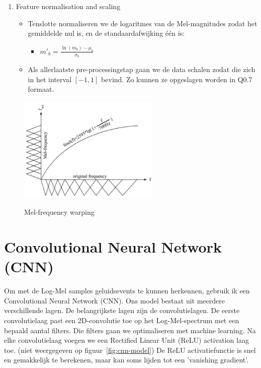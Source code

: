 \begin{no-awa}
\begin{enumerate}
	\item Feature normalisation and scaling
	      \begin{itemize}
		      \item Tenslotte normaliseren we de logaritmes van de Mel-magnitudes zodat het gemiddelde nul is, en de standaardafwijking één is:
		            \begin{itemize}[label={}]
			            \item \(m'_b = \frac{\ln\left( m_b \right) - \mu_b}{\sigma_b}\)
		            \end{itemize}
		      \item Als allerlaatste pre-processingstap gaan we de data schalen zodat die zich in het interval \(\left[ -1,1 \right]\) bevind. Zo kunnen ze opgeslagen worden in Q0.7 formaat. \cite{enwiki:q-format}
	      \end{itemize}
\end{enumerate}
\end{no-awa}


\begin{figure}[ht]
	\centering
	\includegraphics[width=0.6\textwidth]{figuren/Mel-frequency.png}
	\caption{Mel-frequency warping}
	\cite{efficient-feature-extraction}
	\label{fig:Mel-bands}
\end{figure}


\section{Convolutional Neural Network (CNN)}

Om met de Log-Mel samples geluidsevents te kunnen herkennen, gebruik ik een Convolutional Neural Network (CNN). Ons model bestaat uit meerdere verschillende lagen. De belangrijkste lagen zijn de convolutielagen. De eerste convolutielaag past een 2D-convolutie toe op het Log-Mel-spectrum met een bepaald aantal filters. Die filters gaan we optimaliseren met machine learning.
Na elke convolutielaag voegen we een Rectified Linear Unit (ReLU) activation laag toe. (niet weergegeven op figuur~\ref{fig:cnn-model}) De ReLU activatiefunctie is snel en gemakkelijk te berekenen, \cite{enwiki:relu} maar kan soms lijden tot een 'vanishing gradient'. \cite{enwiki:vanishing-gradient}


